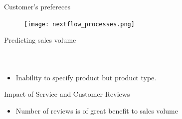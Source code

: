 \documentclass{beamer}
\begin{document}
\begin{frame}[t]{Customer's prefereces} \vspace{5pt}
\centering
\begin{figure}
\texttt{[image: nextflow\_processes.png]}\\

\centering
\end{figure}
\end{frame}



\begin{frame}[t]{Predicting sales volume} \vspace{30pt}
\begin{columns}[onlytextwidth]
\centering
\begin{figure}
\centering
\end{figure}
\centering
\begin{figure}
\centering
\end{figure}
\end{columns}
\vspace{10pt}
\centering
\begin{itemize}
\item Inability to specify product but product type.
\end{itemize}
\centering
\end{frame}


\begin{frame}[t]{Impact of Service and Customer Reviews} \vspace{4pt}
\centering
\begin{figure}
\centering
\end{figure}
\vspace{10pt}
\centering
\begin{itemize}
\item Number of reviews is of great benefit to sales volume
\end{itemize}
\centering
\end{frame}
\end{document}
